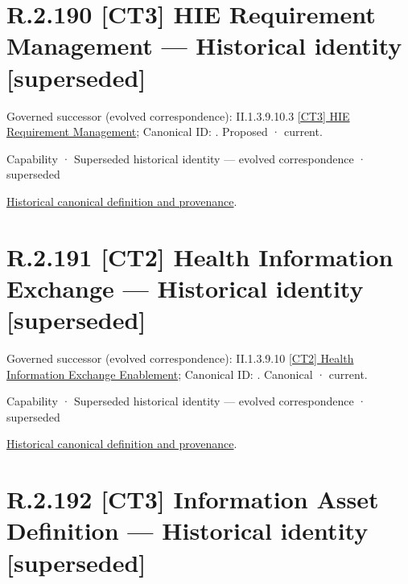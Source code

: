 \section*{R.2.190 [CT3] HIE Requirement Management — Historical identity [superseded]}
\label{navigation:R.2.190}

{\small Governed successor (evolved correspondence): II.1.3.9.10.3 \hyperref[element:1c852a1799984feba50011172983c865]{[CT3] HIE Requirement Management}; Canonical ID: \texttt{}. Proposed · current.}\par
\label{element:a32c8bff0c284f5c9d6ab1f46991c232}
{\small Capability · Superseded historical identity — evolved correspondence · superseded}\par
\href{../../../../continuum/strategy/capability/a32c8bff0c284f5c9d6ab1f46991c232.md}{Historical canonical definition and provenance}.\par
\section*{R.2.191 [CT2] Health Information Exchange — Historical identity [superseded]}
\label{navigation:R.2.191}

{\small Governed successor (evolved correspondence): II.1.3.9.10 \hyperref[element:a61a15908ed544e6acf3e9cab63a0267]{[CT2] Health Information Exchange Enablement}; Canonical ID: \texttt{}. Canonical · current.}\par
\label{element:330d1c43856a4322a2e9f331b1a5ed20}
{\small Capability · Superseded historical identity — evolved correspondence · superseded}\par
\href{../../../../continuum/strategy/capability/330d1c43856a4322a2e9f331b1a5ed20.md}{Historical canonical definition and provenance}.\par
\section*{R.2.192 [CT3] Information Asset Definition — Historical identity [superseded]}
\label{navigation:R.2.192}

